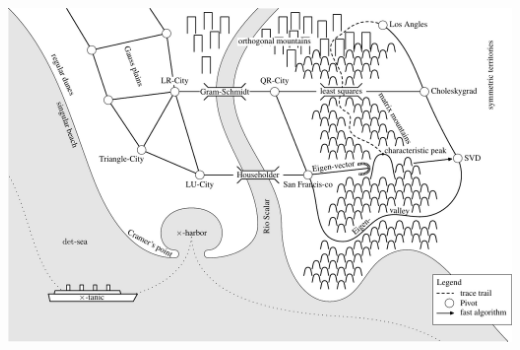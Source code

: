 \begin{landscape}
\begin{center}
\includegraphics[width=0.95\hsize]{images/linalgmap-1}
\end{center}
\end{landscape}
